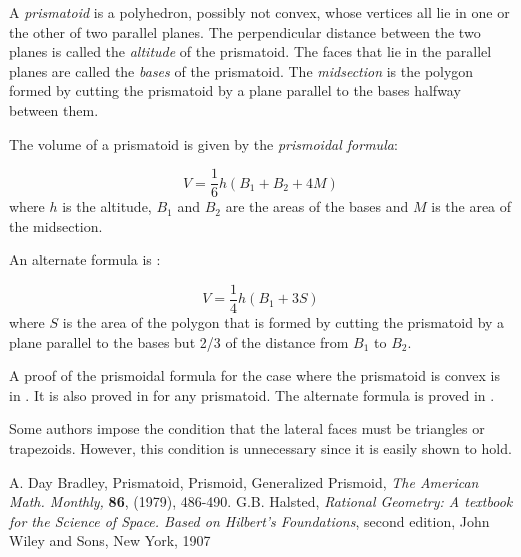 \documentclass[12pt]{article}
\begin{document}
A \emph{prismatoid} is a polyhedron, possibly not convex, whose vertices all lie in one or the other 
of two parallel planes.
The perpendicular distance between the two planes is called the \emph{altitude}
of the prismatoid.
The faces that lie in the parallel planes are called the \emph{bases}
of the prismatoid.
The \emph{midsection} is the polygon formed by cutting the prismatoid by
 a plane parallel to the bases halfway between them.

The volume of a prismatoid is given by the \emph{prismoidal formula}:

$$
V = \frac{1}{6} h(B_1 + B_2 + 4M)
$$
where $h$ is the altitude, $B_1$ and $B_2$ are the areas of the bases and $M$
is the area of the midsection. 

An alternate formula is :

$$
V = \frac{1}{4}h ( B_1 + 3S)
$$ 
where $S$ is the area of the polygon that is formed by cutting the prismatoid
by a plane parallel to the bases but 2/3 of the distance from $B_1$ to $B_2$.

A proof of the prismoidal formula for the case where
the prismatoid is convex is in \cite{Br}. It is also proved in \cite{Ha} for any prismatoid.
The alternate formula is proved in \cite{Ha}.

Some authors impose the condition that the lateral faces must be triangles
or trapezoids. However, this condition is unnecessary since it is easily shown
to hold. 

\begin{thebibliography}{99}
A. Day Bradley, Prismatoid, Prismoid, Generalized Prismoid, \emph{The American Math. Monthly,}
\textbf{86}, (1979), 486-490.
G.B. Halsted, \emph{Rational Geometry: A textbook for the Science of Space. Based on
Hilbert's Foundations}, second edition, John Wiley and Sons, New York, 1907
\end{thebibliography}



\end{document}
